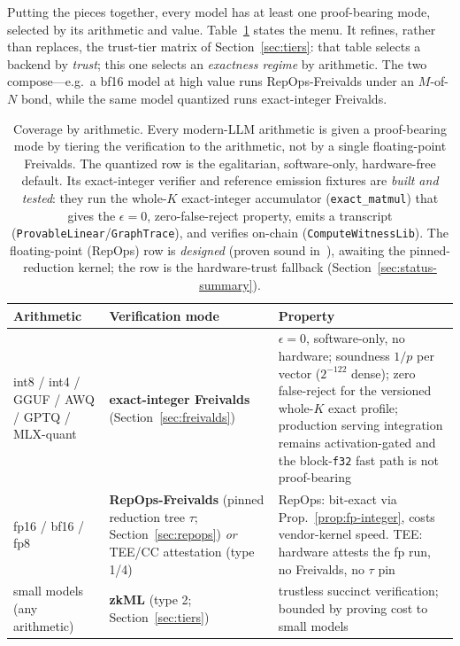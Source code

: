 Putting the pieces together, every model has at least one proof-bearing mode, selected
by its arithmetic and value. Table~\ref{tab:fp-coverage} states the menu. It refines,
rather than replaces, the trust-tier matrix of Section~\ref{sec:tiers}: that table
selects a backend by \emph{trust}; this one selects an \emph{exactness regime} by
arithmetic. The two compose---e.g.\ a bf16 model at high value runs RepOps-Freivalds
under an $M$-of-$N$ bond, while the same model quantized runs exact-integer Freivalds.

\begin{table}[t]
\centering
\caption{Coverage by arithmetic. Every modern-LLM arithmetic is given a proof-bearing mode
by tiering the verification to the arithmetic, not by a single floating-point Freivalds.
The quantized row is the egalitarian, software-only, hardware-free default. Its
exact-integer verifier and reference emission fixtures are \emph{built and tested}: they run the whole-$K$ exact-integer accumulator
(\texttt{exact\_matmul}) that gives the $\epsilon=0$, zero-false-reject property, emits a
transcript (\texttt{ProvableLinear}/\texttt{GraphTrace}), and verifies on-chain
(\texttt{ComputeWitnessLib}). The floating-point (RepOps) row is \emph{designed} (proven
sound in~\cite{poisoundness}), awaiting the pinned-reduction kernel; the \TEE{} row is the
hardware-trust fallback (Section~\ref{sec:status-summary}).}
\label{tab:fp-coverage}
\small
\begin{tabular}{@{}p{2.8cm}p{4.5cm}p{4.9cm}@{}}
\toprule
Arithmetic & Verification mode & Property \\
\midrule
int8 / int4 / GGUF / AWQ / GPTQ / MLX-quant
  & \textbf{exact-integer Freivalds} (Section~\ref{sec:freivalds})
  & $\epsilon=0$, software-only, no hardware; soundness $1/p$ per vector
    ($2^{-122}$ dense); zero false-reject for the versioned whole-$K$ exact profile;
    production serving integration remains activation-gated and the block-\texttt{f32}
    fast path is not proof-bearing \\[2pt]
fp16 / bf16 / fp8
  & \textbf{RepOps-Freivalds} (pinned reduction tree $\tau$;
    Section~\ref{sec:repops}) \emph{or} TEE/CC attestation (type 1/4)
  & RepOps: bit-exact via Prop.~\ref{prop:fp-integer}, costs vendor-kernel speed.
    TEE: hardware attests the fp run, no Freivalds, no $\tau$ pin \\[2pt]
small models (any arithmetic)
  & \textbf{zkML} (type 2; Section~\ref{sec:tiers})
  & trustless succinct verification; bounded by proving cost to small models \\
\bottomrule
\end{tabular}
\end{table}

